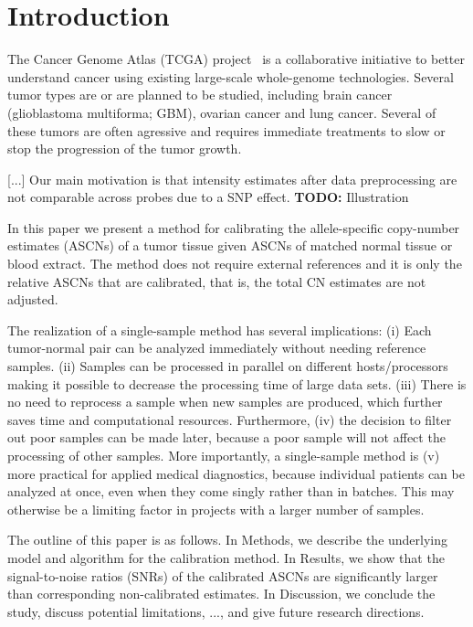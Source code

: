 \documentclass[]{bioinfo}
\newenvironment{TODO}{\color{red}\textbf{TODO:}}{}
\begin{document}
\section{Introduction}
\label{secBackground}

The Cancer Genome Atlas (TCGA) project~\citep{CollinsBarker_2007,TCGA_2008c} is a collaborative initiative to better understand cancer using existing large-scale whole-genome technologies.  Several tumor types are or are planned to be studied, including brain cancer (glioblastoma multiforma; GBM), ovarian cancer and lung cancer.  Several of these tumors are often agressive and requires immediate treatments to slow or stop the progression of the tumor growth.

[...]
Our main motivation is that intensity estimates after data preprocessing are not comparable across probes due to a SNP effect.
\begin{TODO}
  Illustration
\end{TODO}


In this paper we present a method for calibrating the allele-specific copy-number estimates (ASCNs) of a tumor tissue given ASCNs of matched normal tissue or blood extract.  The method does not require external references and it is only the relative ASCNs that are calibrated, that is, the total CN estimates are not adjusted.

The realization of a single-sample method has several implications:
(i) Each tumor-normal pair can be analyzed immediately without needing reference samples.
(ii) Samples can be processed in parallel on different hosts/processors making it possible to decrease the processing time of large data sets.
(iii) There is no need to reprocess a sample when new samples are produced, which further saves time and computational resources.
Furthermore, (iv) the decision to filter out poor samples can be made later, because a poor sample will not affect the processing of other samples.
More importantly, a single-sample method is
(v) more practical for applied medical diagnostics, because individual patients can be analyzed at once, even when they come singly rather than in batches.  This may otherwise be a limiting factor in projects with a larger number of samples.

The outline of this paper is as follows. 
In Methods, we describe the underlying model and algorithm for the calibration method.
In Results, we show that the signal-to-noise ratios (SNRs) of the calibrated ASCNs are significantly larger than corresponding non-calibrated estimates.
In Discussion, we conclude the study, discuss potential limitations, ..., and give future research directions.
\end{document}
